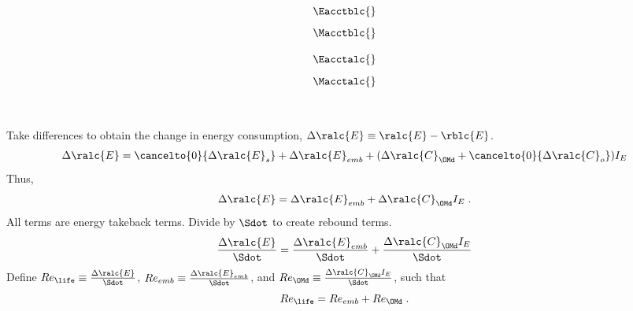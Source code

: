

\begin{landscape}

\linespread{1}


\sectionsep{}

{
\begin{equation}
  \Eacctblc{}
\end{equation}
}
{
\begin{equation}
  \Macctblc{}
\end{equation}
}

\sectionsep{}

{
\begin{equation}
  \Eacctalc{}
\end{equation}
}
{
\begin{equation}
  \Macctalc{}
\end{equation}
}

\sectionsep{}

\derivsection{}
{
~
    
Take differences to obtain the change in energy consumption, $\Delta \ralc{E} \equiv \ralc{E} - \rblc{E}$.
%
\begin{equation}
  \Delta \ralc{E} = \cancelto{0}{\Delta \ralc{E}_s}
                    + \Delta \ralc{E}_{emb}
                    + (\Delta \ralc{C}_{\OMd} + \cancelto{0}{\Delta \ralc{C}_o}) I_E
\end{equation}
%
Thus, 
%
\begin{equation}
  \Delta \ralc{E} = \Delta \ralc{E}_{emb} + \Delta \ralc{C}_{\OMd} I_E \; .
\end{equation}
%
All terms are energy takeback terms.
Divide by $\Sdot$
to create rebound terms.
%
\begin{equation}
  \frac{\Delta \ralc{E}}{\Sdot} = \frac{\Delta \ralc{E}_{emb}}{\Sdot} + \frac{\Delta \ralc{C}_{\OMd} I_E}{\Sdot}
\end{equation}
%
Define
$Re_{\life} \equiv \frac{\Delta \ralc{E}}{\Sdot}$, 
$Re_{emb} \equiv \frac{\Delta \ralc{E}_{emb}}{\Sdot}$, and
$Re_{\OMd} \equiv \frac{\Delta \ralc{C}_{\OMd} I_E}{\Sdot}$,
such that
%
\begin{equation} \label{eq:Re_lc_def}
  Re_{\life} = Re_{emb} + Re_{\OMd} \; .
\end{equation}
%
}
{
~

}
\end{landscape}

